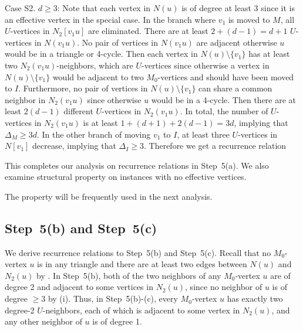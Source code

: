 \documentclass{elsart_TR2}
\begin{document}
Case S2. $d\geq 3$:
Note that each vertex in $N(u)$ is of degree at least 3 since it is an effective vertex in the special case.
In the branch where $v_1$ is moved to $M$, all $U$-vertices in $N_2[v_1u]$ are eliminated.
There are at least $2+(d-1)=d+1$ $U$-vertices in $N(v_1u)$. No pair of vertices in $N(v_1u)$ are adjacent otherwise $u$ would be in a triangle or 4-cycle.
Then each vertex in $N(u)\setminus\{v_1\}$ has at least two $N_2(v_1u)$-neighbors,
which are $U$-vertices since otherwise a vertex in $N(u)\setminus\{v_1\}$ would be adjacent to two $M_0$-vertices
and should have been moved to $I$.
Furthermore, no pair of vertices in $N(u)\setminus\{v_1\}$ can share a common neighbor in $N_2(v_1u)$
since otherwise $u$ would be in a 4-cycle.
Then there are at least $2(d-1)$ different $U$-vertices in $N_2(v_1u)$.
In total, the number of $U$-vertices in  $N_2(v_1u)$ is at least $1+(d+1)+2(d-1)=3d$, implying that $\Delta_M \geq 3d$.
In the other branch of moving $v_1$ to $I$, at least three $U$-vertices in $N[v_1]$ decrease, implying that $\Delta_I \geq 3$.
Therefore we get a recurrence relation


\medskip
This completes our analysis on recurrence relations  in  Step~5(a).
We also examine  structural property on
instances with no effective vertices.


The  property will be frequently used in the next analysis.


\subsection{Step~5(b) and Step~5(c)}
We  derive recurrence relations to Step~5(b) and Step~5(c).
Recall that
no $M_0$-vertex $u$ is  in any triangle and there are at least two edges between $N(u)$ and $N_2(u)$ by .
In Step~5(b),  both of the two neighbors of any $M_0$-vertex $u$ are of degree 2 and
adjacent to some vertices in $N_2(u)$, since no neighbor of $u$ is of degree $\geq3$ by (i).
Thus, in Step~5(b)-(c), every $M_0$-vertex $u$ has exactly two degree-2 $U$-neighbors,
each of which is adjacent to some vertex in $N_2(u)$,
and any other neighbor of $u$ is of degree 1.
\end{document}
